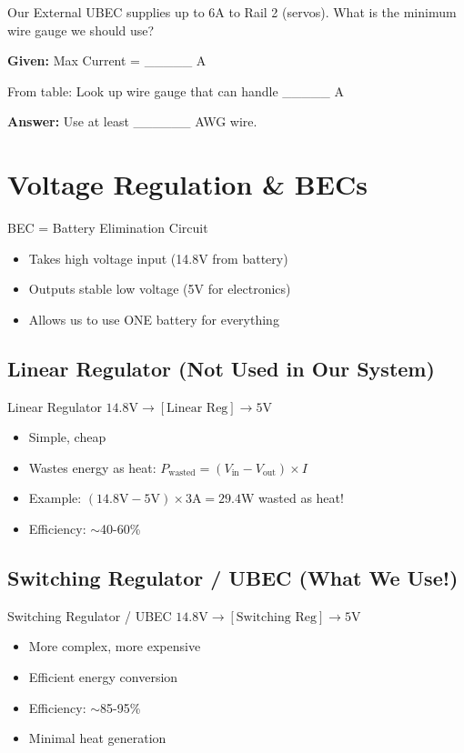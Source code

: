 \documentclass[11pt,letterpaper]{article}
\begin{document}
Our External UBEC supplies up to 6A to Rail 2 (servos). What is the minimum wire gauge we should use?

\textbf{Given:} Max Current = \_\_\_\_\_ A

From table: Look up wire gauge that can handle \_\_\_\_\_ A

\textbf{Answer:} Use at least \_\_\_\_\_\_ AWG wire.

\section{Voltage Regulation \& BECs}

BEC = Battery Elimination Circuit
\begin{itemize}
  \item Takes high voltage input (14.8V from battery)
  \item Outputs stable low voltage (5V for electronics)
  \item Allows us to use ONE battery for everything
\end{itemize}

\subsection{Linear Regulator (Not Used in Our System)}

\begin{conceptbox}{Linear Regulator}
$14.8\text{V} \rightarrow [\text{Linear Reg}] \rightarrow 5\text{V}$

\begin{itemize}
  \item Simple, cheap
  \item Wastes energy as heat: $P_{\text{wasted}} = (V_{\text{in}} - V_{\text{out}}) \times I$
  \item Example: $(14.8\text{V} - 5\text{V}) \times 3\text{A} = 29.4\text{W}$ wasted as heat!
  \item Efficiency: $\sim$40-60\%
\end{itemize}
\end{conceptbox}

\subsection{Switching Regulator / UBEC (What We Use!)}

\begin{conceptbox}{Switching Regulator / UBEC}
$14.8\text{V} \rightarrow [\text{Switching Reg}] \rightarrow 5\text{V}$

\begin{itemize}
  \item More complex, more expensive
  \item Efficient energy conversion
  \item Efficiency: $\sim$85-95\%
  \item Minimal heat generation
\end{itemize}
\end{conceptbox}
\end{document}
